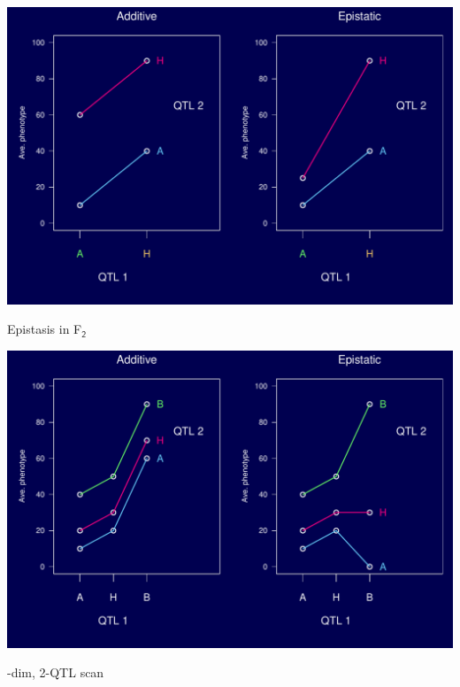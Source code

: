 \documentclass[12pt]{article}
\newcommand{\headsize}{\fontsize{35}{35} \selectfont}
\begin{document}
\vfill

\centerline{\includegraphics{Figs/epistasis_bc.pdf}}


\newpage

\headsize \color{myyellow}
\hfill \begin{minipage}{5.75in}
\centering
Epistasis in F$_{\mathsf{2}}$
\end{minipage}

\vfill

\centerline{\includegraphics{Figs/epistasis_f2.pdf}}



\newpage

\headsize \color{myyellow}
\hfill \begin{minipage}{5.75in}
-dim, 2-QTL scan
\end{minipage}

\vspace{2cm}
\end{document}
